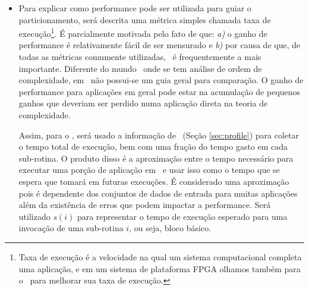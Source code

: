    \begin{frame}
      \begin{itemize}
         \item 
         
      Para explicar como performance pode ser utilizada para guiar o particionamento, será descrita uma métrica simples chamada taxa de execução\footnote{Taxa de execução é a velocidade na qual um sistema computacional completa uma aplicação, e em um sistema de plataforma FPGA olhamos também para o \hardware\ para melhorar sua taxa de execução.}.
      É parcialmente motivada pelo fato de que: \textit{a)} o ganho de performance é relativamente fácil de ser mensurado e \textit{b)} por causa de que, de todas as métricas comumente utilizadas, \speedup\ é frequentemente a mais importante.
      Diferente do mundo \software\ onde se tem análise de ordem de complexidade, em \hardware\ não possui-se um guia geral para comparação.
      O ganho de performance para aplicações em geral pode estar na acumulação de pequenos ganhos que deveriam ser perdido numa aplicação direta na teoria de complexidade.

      Assim, para o \software, será usado a informação de \profile\ (Seção \ref{sec:profile}) para coletar o tempo total de execução, bem com uma fração do tempo gasto em cada sub-rotina.
      O produto disso é a aproximação entre o tempo necessário para executar uma porção de aplicação em \software\ e usar isso como o tempo que se espera que tomará em futuras execuções.
      É considerado uma aproximação pois é dependente dos conjuntos de dados de entrada para muitas aplicações além da existência de erros que podem impactar a performance.
      Será utilizado $ s(i) $ para representar o tempo de execução esperado para uma invocação de uma sub-rotina $ i $, ou seja, bloco básico.
      \end{itemize}
   \end{frame}
   
